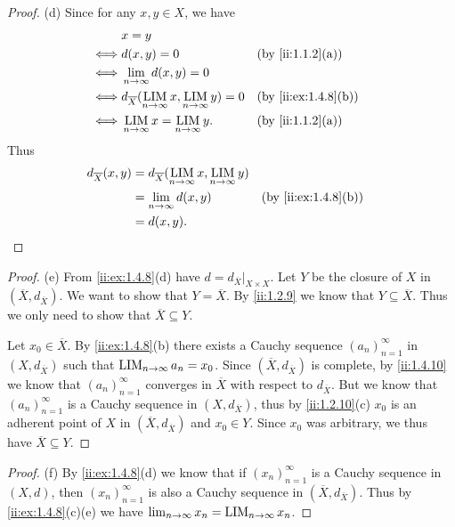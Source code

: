 \begin{proof}{(d)}
  Since for any \(x, y \in X\), we have
  \begin{align*}
         & x = y                                                                                       \\
    \iff & d(x, y) = 0                                                        &  & \by{ii:1.1.2}[a]    \\
    \iff & \lim_{n \to \infty} d(x, y) = 0                                                             \\
    \iff & d_{\overline{X}}(\LIM_{n \to \infty} x, \LIM_{n \to \infty} y) = 0 &  & \by{ii:ex:1.4.8}[b] \\
    \iff & \LIM_{n \to \infty} x = \LIM_{n \to \infty} y.                     &  & \by{ii:1.1.2}[a]
  \end{align*}
  Thus
  \begin{align*}
    d_{\overline{X}}(x, y) & = d_{\overline{X}}(\LIM_{n \to \infty} x, \LIM_{n \to \infty} y)                          \\
                           & = \lim_{n \to \infty} d(x, y)                                    &  & \by{ii:ex:1.4.8}[b] \\
                           & = d(x, y).
  \end{align*}
\end{proof}

\begin{proof}{(e)}
  From \cref{ii:ex:1.4.8}(d) have \(d = d_{\overline{X}}|_{X \times X}\).
  Let \(Y\) be the closure of \(X\) in \((\overline{X}, d_{\overline{X}})\).
  We want to show that \(Y = \overline{X}\).
  By \cref{ii:1.2.9} we know that \(Y \subseteq \overline{X}\).
  Thus we only need to show that \(\overline{X} \subseteq Y\).

  Let \(x_0 \in \overline{X}\).
  By \cref{ii:ex:1.4.8}(b) there exists a Cauchy sequence \((a_n)_{n = 1}^\infty\) in \((X, d_{\overline{X}})\) such that \(\operatorname*{LIM}_{n \to \infty} a_n = x_0\).
  Since \((\overline{X}, d_{\overline{X}})\) is complete, by \cref{ii:1.4.10} we know that \((a_n)_{n = 1}^\infty\) converges in \(\overline{X}\) with respect to \(d_{\overline{X}}\).
  But we know that \((a_n)_{n = 1}^\infty\) is a Cauchy sequence in \((X, d_{\overline{X}})\), thus by \cref{ii:1.2.10}(c) \(x_0\) is an adherent point of \(X\) in \((\overline{X}, d_{\overline{X}})\) and \(x_0 \in Y\).
  Since \(x_0\) was arbitrary, we thus have \(\overline{X} \subseteq Y\).
\end{proof}

\begin{proof}{(f)}
  By \cref{ii:ex:1.4.8}(d) we know that if \((x_n)_{n = 1}^\infty\) is a Cauchy sequence in \((X, d)\), then \((x_n)_{n = 1}^\infty\) is also a Cauchy sequence in \((\overline{X}, d_{\overline{X}})\).
  Thus by \cref{ii:ex:1.4.8}(c)(e) we have \(\lim_{n \to \infty} x_n = \operatorname*{LIM}_{n \to \infty} x_n\).
\end{proof}
